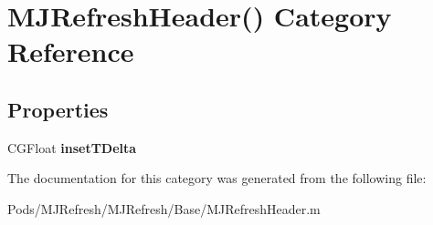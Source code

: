 \hypertarget{category_m_j_refresh_header_07_08}{}\section{M\+J\+Refresh\+Header() Category Reference}
\label{category_m_j_refresh_header_07_08}
\subsection*{Properties}
\begin{DoxyCompactItemize}
\item 
\mbox{\label{category_m_j_refresh_header_07_08_a6e6ec0e97ca13dd4861cc776225abc5a}} 
C\+G\+Float {\bfseries inset\+T\+Delta}
\end{DoxyCompactItemize}


The documentation for this category was generated from the following file\+:\begin{DoxyCompactItemize}
\item 
Pods/\+M\+J\+Refresh/\+M\+J\+Refresh/\+Base/M\+J\+Refresh\+Header.\+m\end{DoxyCompactItemize}
